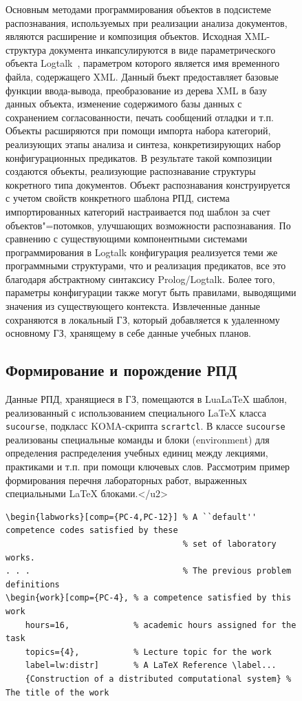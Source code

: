 \documentclass[ 

]{aiitart}
\providecommand{\LuaLaTeX}{Lua\LaTeX}
\begin{document}
\begin{figure}
Основным методами программирования объектов в подсистеме распознавания, используемых при реализации анализа документов, являются расширение и композиция объектов. Исходная XML-структура документа инкапсулируются в виде параметрического объекта Logtalk~\cite{logtalk}, параметром которого является имя временного файла, содержащего XML. Данный бъект предоставляет базовые функции ввода-вывода, преобразование из дерева XML в базу данных объекта, изменение содержимого базы данных с сохранением согласованности, печать сообщений отладки и т.п. Объекты расширяются при помощи импорта набора категорий, реализующих этапы анализа и синтеза, конкретизирующих набор конфигурационных предикатов.  В результате такой композиции создаются объекты, реализующие распознавание структуры кокретного типа документов. Объект распознавания конструируется с учетом свойств конкретного шаблона РПД, система импортированных категорий настраивается под шаблон за счет объектов"=потомков, улучшающих возможности распознавания. По сравнению с существующими компонентными системами программирования в Logtalk конфигурация реализуется теми же программными структурами, что и реализация предикатов, все это благодаря абстрактному синтаксису Prolog/Logtalk.  Более того, параметры конфигурации также могут быть правилами, выводящими значения из существующего контекста. Извлеченные данные сохраняются в локальный ГЗ, который добавляется к удаленному основному ГЗ, хранящему в себе данные учебных планов. 

\subsection{Формирование и порождение РПД} 

Данные РПД, хранящиеся в ГЗ, помещаются в \LuaLaTeX{} шаблон, реализованный с использованием специального \LaTeX{} класса \verb|sucourse|, подкласс KOMA-скрипта \verb|scrartcl|.  В классе \verb|sucourse| реализованы специальные команды и блоки (environment) для определения распределения учебных единиц между лекциями, практиками и т.п. при помощи ключевых слов. Рассмотрим пример формирования перечня лабораторных работ, выраженных специальными \LaTeX{} блоками.</u2> 

\begin{verbatim}
\begin{labworks}[comp={PC-4,PC-12}] % A ``default'' competence codes satisfied by these
                                    % set of laboratory works.
. . .                               % The previous problem definitions
\begin{work}[comp={PC-4}, % a competence satisfied by this work
    hours=16,             % academic hours assigned for the task
    topics={4},           % Lecture topic for the work
    label=lw:distr]       % A LaTeX Reference \label...
    {Construction of a distributed computational system} % The title of the work

\end{verbatim}
\end{figure}
\end{document}
